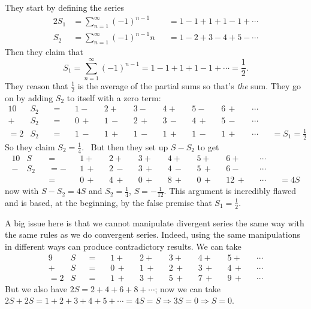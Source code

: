 \documentclass[letterpaper, 11pt, openany]{book}
\theoremstyle{mytheoremstyle}
\theoremstyle{myexamplestyle}
\begin{document}
They start by defining the series
\begin{alignat*}{2}
    S_{1} &= \sum_{n=1}^{\infty} (-1)^{n-1}     &&= 1 - 1 + 1 + 1 - 1 + \cdots \\
    S_{2} &= \sum_{n=1}^{\infty} (-1)^{n-1} n   &&= 1 - 2 + 3 - 4 + 5 - \cdots
\end{alignat*}
Then they claim that
\[S_{1} = \sum_{n=1}^{\infty} (-1)^{n-1} = 1 - 1 + 1 + 1 - 1 + \cdots = \frac{1}{2}.\]
They reason that $\frac{1}{2}$ is the average of the partial sums so that's \textit{the} sum. They go on by adding $S_{2}$ to itself with a zero term:
\begin{alignat*}{10}
        &S_{2} {\,}&&= {\,}&&1 - {\,}&&2 + {\,}&&3 - {\,}&&4 + {\,}&&5 - {\,}&&6 {\,}+ {\,}&&\cdots&&\\
    +   &S_{2} &&= &&0 {\,}+ &&1 {\,}- &&2 {\,}+ &&3 {\,}- &&4 {\,}+ &&5 {\,}- &&\cdots&&\\
    =  2&S_{2} &&= &&1 {\,}- &&1 {\,}+ &&1 {\,}- &&1 {\,}+ &&1 {\,}- &&1 {\,}+ &&\cdots &&= S_{1} = \frac{1}{2} 
\end{alignat*}
So they claim $S_{2} = \frac{1}{4}$. \faMeh \, But then they set up $S - S_{2}$ to get 
\begin{alignat*}{10}
    &S {\,} &&= {\,}&&1 + {\,}&&2 + {\,}&&3 + {\,}&&4 + {\,}&&5 + {\,}&&6 + &&\cdots&&\\
-   &S_{2}  &&=    -&&1 {\,}+ &&2 {\,}- &&3 {\,}+ &&4 {\,}- &&5 {\,}+ &&6 - &&\cdots&&\\
   &       &&=     &&0 {\,}+ &&4 {\,}+ &&0 {\,}+ &&8 {\,}+ &&0 {\,}+ &&12 {\,}+ &&\cdots &&= 4S 
\end{alignat*}
now with $S - S_{2} = 4S$ and $S_{2} = \frac{1}{4}$, $S = -\frac{1}{12}$. \faFrown \;
This argument is incredibly flawed and is based, at the beginning, by the false premise that $S_{1} = \frac{1}{2}$. 

A big issue here is that we cannot manipulate divergent series the same way with the same rules as we do convergent series. Indeed, using the same manipulations in different ways can produce contradictory results. We can take
\begin{alignat*}{9}
    &S  &&=    {\,}&& 1 + {\,}    && 2 + {\,}    && 3 + {\,}    && 4 + {\,}    && 5 + {\,} &&\cdots \\
   +&S  &&=         && 0 {\,}+     && 1 {\,}+     && 2 {\,}+     && 3 {\,}+     && 4 {\,}+  &&\cdots \\
   =2&S &&=         && 1 {\,}+     && 3 {\,}+     && 5 {\,}+     && 7 {\,}+     && 9 {\,}+  &&\cdots
\end{alignat*}
But we also have $2S = 2 + 4 + 6 + 8 + \cdots$; now we can take $2S + 2S = 1 + 2 + 3 + 4 + 5 + \cdots = 4S = S \Rightarrow 3S = 0 \Rightarrow S = 0$. \faMeh
\end{document}
